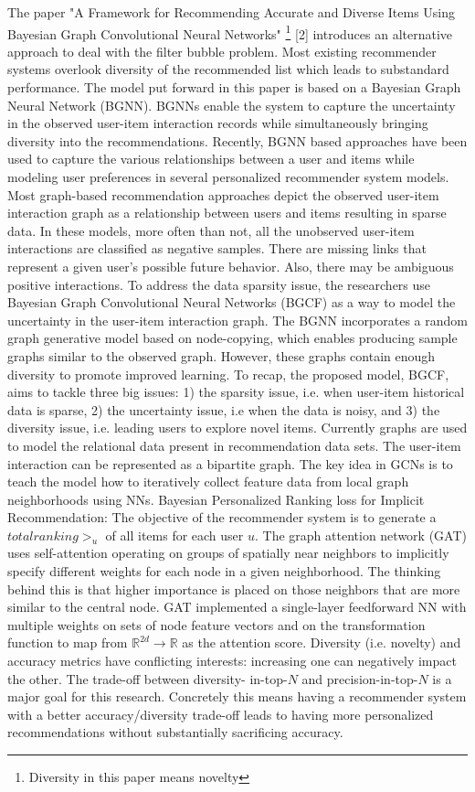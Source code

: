 The paper "A Framework for Recommending Accurate and Diverse Items  Using Bayesian Graph Convolutional Neural Networks" \footnote {Diversity in this paper means novelty} [2] introduces an alternative approach to deal with the filter bubble problem. Most existing recommender systems overlook diversity of the recommended list which leads to substandard performance. The model put forward in this paper is based on a Bayesian Graph Neural Network (BGNN). BGNNs enable the system to capture the uncertainty in the observed user-item interaction records while simultaneously bringing diversity into the recommendations.  Recently, BGNN based approaches have been used to capture the various relationships between a user and items while modeling user preferences in several personalized recommender system models. Most graph-based recommendation approaches depict the observed user-item interaction graph as a relationship between users and items resulting in sparse data. In these models, more often than not, all the unobserved user-item interactions are classified as negative samples. There are missing links that represent a given user’s possible future behavior. Also, there may be ambiguous positive interactions. To address the data sparsity issue, the researchers use Bayesian Graph Convolutional Neural Networks (BGCF) as a way to model the uncertainty in the user-item interaction graph. The BGNN incorporates a random graph generative model based on node-copying, which enables producing sample graphs similar to the observed graph. However, these graphs contain enough diversity to promote improved learning. To recap, the proposed model, BGCF, aims to tackle three big issues: 1) the sparsity issue, i.e. when user-item historical data is sparse, 2) the uncertainty issue, i.e when the data is noisy, and 3) the diversity issue, i.e. leading users to explore novel items. Currently graphs are used to model the relational data present in recommendation data sets. The user-item interaction can be represented as a bipartite graph.  The key idea in GCNs is to teach the model how to iteratively collect feature data from local graph neighborhoods using NNs.  Bayesian Personalized Ranking loss for Implicit Recommendation: The objective of the recommender system is to generate a  $total ranking>_u$ of all items for each user $u$. The graph attention network (GAT) uses self-attention operating on groups of spatially near neighbors to implicitly specify different weights for each node in a given neighborhood. The thinking behind this is that higher importance is placed on those neighbors that are more similar to the central node. GAT implemented a single-layer feedforward NN with multiple weights on sets of node feature vectors and on the transformation function to map from $\mathbb{R}^{2d}\longrightarrow\mathbb{R} $ as the attention score. Diversity (i.e. novelty) and accuracy metrics have conflicting interests: increasing one can negatively impact the other. The trade-off between diversity- in-top-$N$ and precision-in-top-$N$ is a major goal for this research. Concretely this means having a recommender system with a better accuracy/diversity trade-off leads to having more personalized recommendations without substantially sacrificing accuracy.

